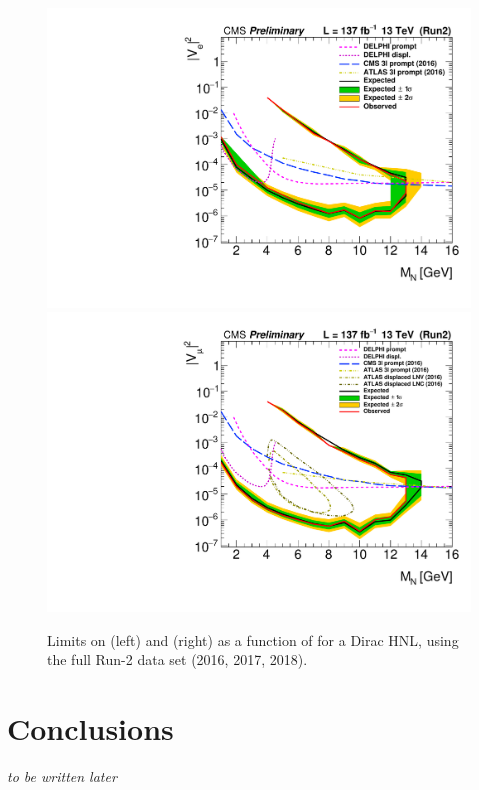 \begin{figure}[h]
  \centering
  \includegraphics[width=.49\textwidth]{Figures/c6/results/limits/dirac/comb/signalStrength_e_Dirac_ele_limits.pdf}
  \hfill{}
  \includegraphics[width=.49\textwidth]{Figures/c6/results/limits/dirac/comb/signalStrength_mu_Dirac_muo_limits.pdf}
  \caption{Limits on \mixpare (left) and \mixparm (right) as a
    function of \mhnl for a Dirac HNL, using the full Run-2 data set
    (2016, 2017, 2018).}
  \label{fig:limits_Dir}
\end{figure}



\section{Conclusions}
\emph{to be written later}

